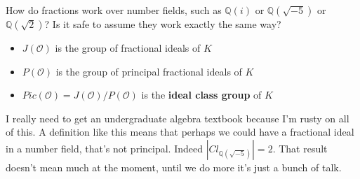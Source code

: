 \documentclass[12pt]{article}
\begin{document}
How do fractions work over number fields, such as $\mathbb{Q}(i)$ or $\mathbb{Q}(\sqrt{-5})$ or $\mathbb{Q}(\sqrt{2})$?  Is it safe to assume they work exactly the same way?
\begin{itemize}
\item $J(\mathcal{O})$ is the group of fractional ideals of $K$
\item $P(\mathcal{O})$ is the group of principal fractional ideals of $K$
\item $Pic(\mathcal{O}) =  J(\mathcal{O})/P(\mathcal{O})$ is the \textbf{ideal class group} of $K$
\end{itemize}
I really need to get an undergraduate algebra textbook because I'm rusty on all of this.  A definition like this means that perhaps we could have a fractional ideal in a number field, that's not principal.  Indeed $|Cl_{\mathbb{Q}(\sqrt{-5})}|=2$.  That result doesn't mean much at the moment, until we do more it's just a bunch of talk.
\end{document}
